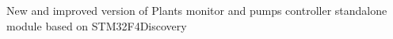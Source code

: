 New and improved version of Plants monitor and pumps controller standalone module based on S\+T\+M32\+F4\+Discovery 